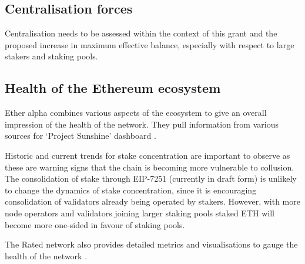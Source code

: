 \documentclass[UTF8]{article}
\begin{document}
\subsection{Centralisation forces}
Centralisation needs to be assessed within the context of this grant and the proposed increase in maximum effective balance, especially with respect to large stakers and staking pools.


\subsection{Health of the Ethereum ecosystem}
Ether alpha combines various aspects of the ecosystem to give an overall impression of the health of the network. They pull information from various sources for `Project Sunshine' dashboard \cite{easunshine}. 

Historic and current trends for stake concentration are important to observe as these are warning signs that the chain is becoming more vulnerable to collusion. The consolidation of stake through EIP-7251 (currently in draft form) \cite{Neuder2023c} is unlikely to change the dynamics of stake concentration, since it is encouraging consolidation of validators already being operated by stakers. However, with more node operators and validators joining larger staking pools staked ETH will become more one-sided in favour of staking pools. 

The Rated network also provides detailed metrics and visualisations to gauge the health of the network \cite{Rated2023a}. 

\clearpage
\end{document}
